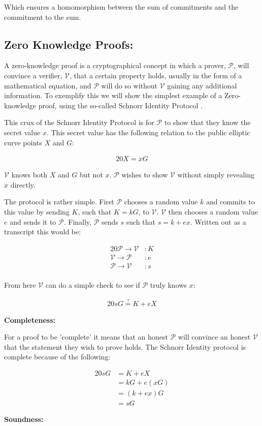 \documentclass{article}
\newcommand{\eq}[1]{\begin{alignat*}{20}#1\end{alignat*}}
\newcommand{\V}{\mathcal{V}}
\renewcommand{\P}{\mathcal{P}}
\begin{document}
Which ensures a homomorphism between the sum of commitments and the
commitment to the sum.

\subsection{Zero Knowledge Proofs:}\label{zero-knowledge}

A zero-knowledge proof is a cryptographical concept in which a prover,
$\P$, will convince a verifier, $\V$, that a certain property holds,
usually in the form of a mathematical equation, and $\P$ will do so
without $\V$ gaining any additional information. To exemplify this we
will show the simplest example of a Zero-knowledge proof, using the
so-called Schnorr Identity Protocol \cite{zkdocs-schnorr}.

This crux of the Schnorr Identity Protocol is for $\P$ to show that
they know the secret value $x$. This secret value has the following
relation to the public elliptic curve points $X$ and $G$:

\eq{
	X = xG
}

$\V$ knows both $X$ and $G$ but not $x$. $\P$ wishes to show $\V$
without simply revealing $x$ directly.

The protocol is rather simple. First $\P$ chooses a random value $k$ and
commits to this value by sending $K$, such that $K = kG$, to $\V$. $\V$
then chooses a random value $e$ and sends it to $\P$. Finally, $\P$
sends $s$ such that $s = k + ex$. Written out as a transcript this
would be:

\eq{
	\P \rightarrow \V &: K \\
	\V \rightarrow \P &: e \\
	\P \rightarrow \V &: s \\
}

From here $\V$ can do a simple check to see if $\P$ truly knows $x$:

\eq{
	sG \stackrel{?}{=} K + eX
}


\textbf{Completeness:}

For a proof to be 'complete' it means that an honest $\P$ will convince
an honest $\V$ that the statement they wish to prove holds. The Schnorr 
Identity protocol is complete because of the following:

\eq{
	sG &= K + eX \\
	   &= kG + e(xG) \\
	   &= (k + ex)G \\
	   &= sG
}

\textbf{Soundness:}
\end{document}
